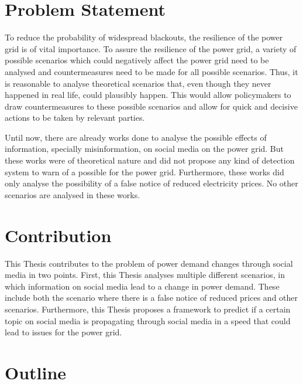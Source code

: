 
\section{Problem Statement}
\label{problemstatement}

To reduce the probability of widespread blackouts, 
the resilience of the power grid is of vital importance.
To assure the resilience of the power grid, a variety of possible 
scenarios which could negatively affect the power grid need
to be analysed and countermeasures need to be made for all possible scenarios.
Thus, it is reasonable to analyse theoretical scenarios that, even though
they never happened in real life, could plausibly happen. This 
would allow policymakers to draw countermeasures to these possible scenarios
and allow for quick and decisive actions to be taken by relevant 
parties.

Until now, there are already works done to analyse the possible effects
of information, specially misinformation, on social media on the power
grid. But these works were of theoretical nature and did not 
propose any kind of detection system to warn of a possible 
for the power grid. Furthermore, these works did only analyse the 
possibility of a false notice of reduced electricity prices.
No other scenarios are analysed in these works. 


\section{Contribution}
\label{contribution}
This Thesis contributes to the problem of power demand changes
through social media in two points.
First, this Thesis analyses multiple different scenarios, in which
information on social media lead to a change in power demand.
These include both the scenario where there is a false notice of 
reduced prices and other scenarios.
Furthermore, this Thesis proposes a framework to predict if 
a certain topic on social media is propagating through social media
in a speed that could lead to issues for the power grid.

\section{Outline}
\label{outline}

